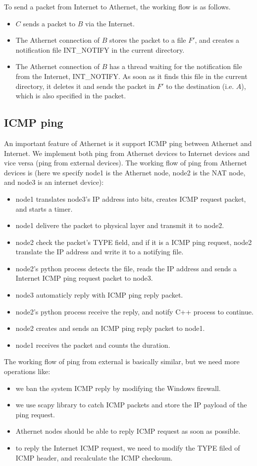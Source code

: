 \documentclass[11pt, conference]{IEEEtran}
\begin{document}
To send a packet from Internet to Athernet, the working flow is as follows.
\begin{itemize}
\item $C$ sends a packet to $B$ via the Internet.
\item The Athernet connection of $B$ stores the packet to a file $F'$, and creates a notification file \textsf{INT\_NOTIFY} in the current directory.
\item The Athernet connection of $B$ has a thread waiting for the notification file from the Internet, \textsf{INT\_NOTIFY}. As soon as it finds this file in the current directory, it deletes it and sends the packet in $F'$ to the destination (i.e. $A$), which is also specified in the packet.
\end{itemize}

\subsection{ICMP ping}
An important feature of Athernet is it support ICMP ping between Athernet and Internet. We implement both ping from Athernet devices to Internet devices and vice versa (ping from external devices). The working flow of
ping from Athernet devices is (here we specify node1 is the Athernet node, node2 is the NAT node, and node3 is an internet device):
\begin{itemize}
    \item node1 translates node3's IP address into bits, creates ICMP request packet, and starts a timer.
    \item node1 delivere the packet to physical layer and transmit it to node2.
    \item node2 check the packet's TYPE field, and if it is a ICMP ping request, node2 translate the IP address and write it to a notifying file.
    \item node2's python process detects the file, reads the IP address and sends a Internet ICMP ping request packet to node3.
    \item node3 automaticly reply with ICMP ping reply packet.
    \item node2's python process receive the reply, and notify C++ process to continue.
    \item node2 creates and sends an ICMP ping reply packet to node1.
    \item node1 receives the packet and counts the duration.
\end{itemize}
The working flow of ping from external is basically similar, but we need more operations like:
\begin{itemize}
    \item we ban the system ICMP reply by modifying the Windows firewall.
    \item we use scapy library to catch ICMP packets and store the IP payload of the ping request.
    \item Athernet nodes should be able to reply ICMP request as soon as possible.
    \item to reply the Internet ICMP request, we need to modify the TYPE filed of ICMP header, and recalculate the ICMP checksum.
\end{itemize}
\end{document}
